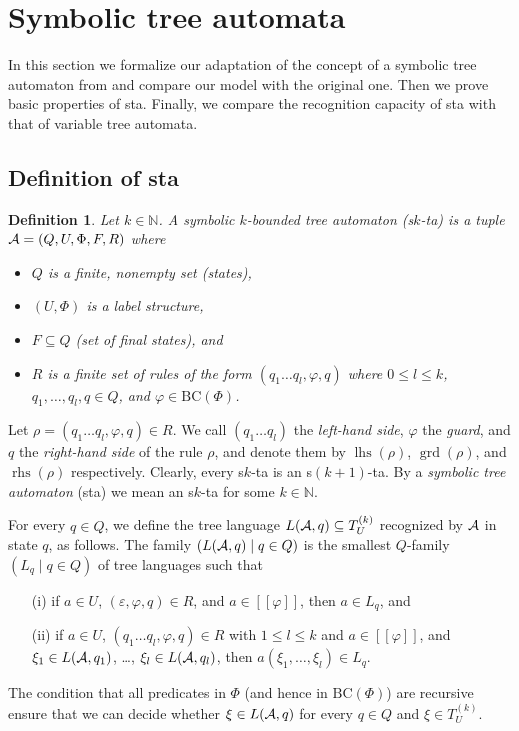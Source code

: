 \documentclass[10pt]{scrartcl}
\newtheorem{df}{Definition}[section]
\newcommand{\nat}{\mathbb{N}}
\newcommand{\seml}{[\![}
\newcommand{\semr}{]\!]}
\newcommand{\BC}{\mathrm{BC}}
\newcommand{\A}{{\cal A}}
\DeclareMathOperator{\grd}{grd}
\DeclareMathOperator{\lhs}{lhs}
\DeclareMathOperator{\rhs}{rhs}
\def\ui#1{^{(#1)}}
\begin{document}
\section{Symbolic tree automata}

In this section we formalize our adaptation of the concept of a symbolic tree automaton from \cite{veabjo11a} and compare our model with the original one. Then we prove basic properties of sta. Finally, we compare the recognition capacity of sta with that of variable tree automata.


\subsection{Definition of sta}\label{sect:sta-def}

\begin{df} \rm Let $k \in \nat$. A \emph{symbolic $k$-bounded  tree automaton} (s$k$-ta) is a tuple $\A = (Q,U,\Phi,F,R)$ where 
\begin{itemize}
\item $Q$ is a finite, nonempty set (states),
\item $(U,\Phi)$ is a label structure,
\item $F \subseteq Q$ (set of final states), and 
\item $R$ is a finite set of rules of the form $(q_1 \ldots q_l, \varphi, q)$
where $0 \le l \le k$, $q_1,\ldots,q_l,q \in Q$, and $\varphi \in \BC(\Phi)$. 
\end{itemize} 
\end{df}
Let $\rho = (q_1 \ldots q_l, \varphi, q) \in R$. We call $(q_1 \ldots q_l)$ the {\em left-hand side}, $\varphi$ the \emph{guard}, and $q$  the {\em right-hand side} of the rule $\rho$, and denote them by $\lhs(\rho)$, $\grd(\rho)$, and $\rhs(\rho)$ respectively. 
Clearly, every s$k$-ta is an s$(k+1)$-ta.  By a {\em symbolic tree automaton} (sta) we mean an s$k$-ta for some $k \in \nat$.


For every $q\in Q$, we define the tree language $L(\A,q)\subseteq
T_U\ui k$ recognized by $\A$ in state $q$, as follows. The family  $(L(\A,q) \mid q \in Q)$ is the smallest $Q$-family $(L_q \mid q \in Q)$ of tree languages such that 
\begin{enumerate}
\item[(i)] if $a \in U$, $(\varepsilon,\varphi,q) \in R$, and $a \in \seml \varphi \semr$, then $a \in L_q$, and 
\item[(ii)] if $a \in U$, $(q_1 \ldots q_l, \varphi, q) \in R$ with $1\le l
  \le k$ and $a \in \seml \varphi\semr$, and $\xi_1 \in L(\A,q_1)$, \ldots, $\xi_l \in L(\A,q_l)$, then $a(\xi_1,\ldots,\xi_l) \in L_q$.
\end{enumerate}
The condition that all predicates in $\Phi$ (and hence in $\BC(\Phi)$) are recursive ensure that we can decide whether $\xi \in L(\A,q)$ for every
$q\in Q$ and $\xi \in T_U\ui k$.
\end{document}
